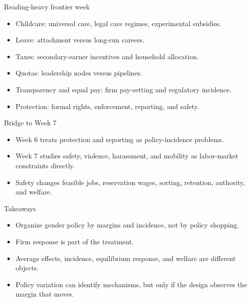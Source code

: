 \documentclass[aspectratio=169,11pt]{beamer}
\begin{document}
\begin{frame}{Reading-heavy frontier week}
\begin{itemize}
    \item Childcare: universal care, legal care regimes, experimental subsidies.
    \item Leave: attachment versus long-run careers.
    \item Taxes: secondary-earner incentives and household allocation.
    \item Quotas: leadership nodes versus pipelines.
    \item Transparency and equal pay: firm pay-setting and regulatory incidence.
    \item Protection: formal rights, enforcement, reporting, and safety.
\end{itemize}
\end{frame}

\begin{frame}{Bridge to Week 7}
\begin{itemize}
    \item Week 6 treats protection and reporting as policy-incidence problems.
    \item Week 7 studies safety, violence, harassment, and mobility as labor-market constraints directly.
    \item Safety changes feasible jobs, reservation wages, sorting, retention, authority, and welfare.
\end{itemize}
\end{frame}

\begin{frame}{Takeaways}
\begin{itemize}
    \item Organize gender policy by margins and incidence, not by policy shopping.
    \item Firm response is part of the treatment.
    \item Average effects, incidence, equilibrium response, and welfare are different objects.
    \item Policy variation can identify mechanisms, but only if the design observes the margin that moves.
\end{itemize}
\end{frame}
\end{document}
